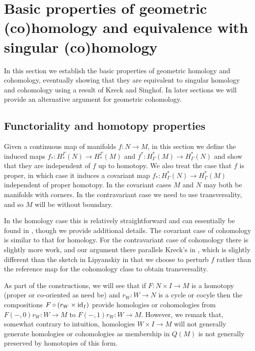 


\section{Basic properties of geometric (co)homology and equivalence with singular (co)homology}\label{S: basic properties}


In this section we establish the basic properties of geometric homology and cohomology, eventually showing that they are equivalent to singular homology and cohomology using a result of Kreck and Singhof. In later sections we will provide an alternative argument for geometric cohomology.


\subsection{Functoriality and homotopy properties}\label{S: functoriality}


Given a continuous map of manifolds $f:N\to M$, in this section we define the induced maps $f_*:H_*^\Gamma(N)\to H_*^\Gamma(M)$ and $f^*:H^*_\Gamma(M)\to H^*_\Gamma(N)$ and show that they are independent of $f$ up to homotopy. We also treat the case that $f$ is proper, in which case it induces a covariant map $f_*:H^*_\Gamma(N)\to H^*_\Gamma(M)$ independent of proper homotopy. In the covariant cases $M$ and $N$ may both be manifolds with corners. In the contravariant case we need to use transversality, and so $M$ will be without boundary.



In the homology case this is relatively straightforward and can essentially be found in \cite[Section 6]{Lipy14}, though we provide additional details. The covariant case of cohomology is similar to that for homology.  For the contravariant case of  cohomology there is slightly more work, and our argument there parallels Kreck's in \cite{Krec10}, which is slightly different than the sketch in Lipyanskiy \cite[Section 6]{Lipy14} in that we choose to perturb $f$ rather than the reference map for the cohomology class to obtain transversality.

As part of the constructions, we will see that if $F:N\times I\to M$ is a homotopy (proper or co-oriented as need be) and $r_W:W\to N$ is a cycle or cocyle then the compositions $F\circ (r_W\times \mathrm{id}_I)$  provide homologies or cohomologies from $F(-,0)r_W:W\to M$ to $F(-,1)r_W:W\to M$. However, we remark that, somewhat contrary to intuition, homologies $W\times I\to M$ will not generally generate homologies or cohomologies as membership in $Q(M)$ is not generally preserved by homotopies of this form.



